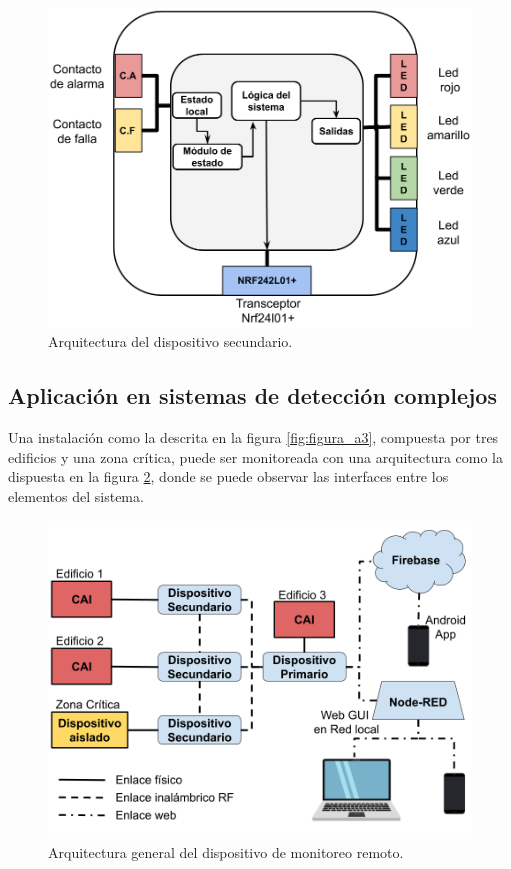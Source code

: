 \begin{figure}[]
	\centering
	\includegraphics[scale=.4]{./Figures/Capitulo3/Fig_D3.png}
	\caption{Arquitectura del dispositivo secundario.}
	\label{fig:figura_d3}
\end{figure} 

\subsection{Aplicación en sistemas de detección complejos}

Una instalación como la descrita en la figura \ref{fig:figura_a3}, compuesta por tres edificios y una zona crítica, puede ser monitoreada con una arquitectura como la dispuesta en la figura \ref{fig:figura_e3}, donde se puede observar las interfaces entre los elementos del sistema.

\begin{figure}[]
	\centering
	\includegraphics[scale=.4]{./Figures/Capitulo3/Fig_E3.png}
	\caption{Arquitectura general del dispositivo de monitoreo remoto.}
	\label{fig:figura_e3}
\end{figure} 

